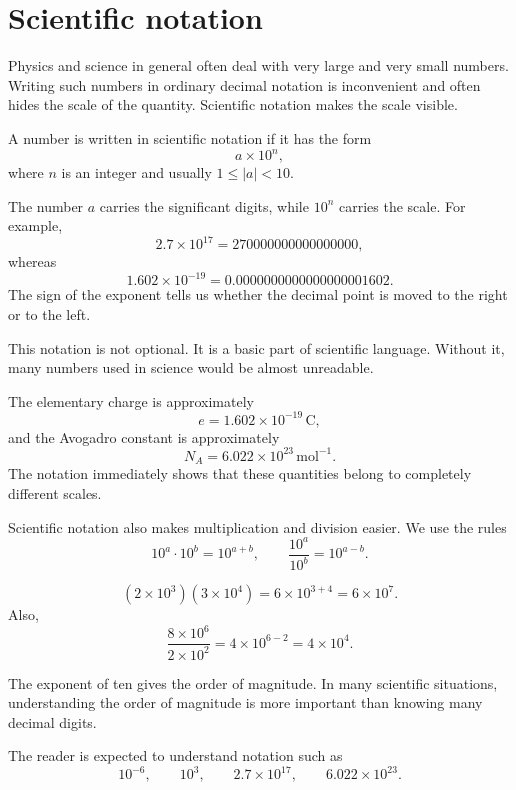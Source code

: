 \section{Scientific notation}

Physics and science in general often deal with very large and very small numbers. Writing such numbers in ordinary decimal notation is inconvenient and often hides the scale of the quantity. Scientific notation makes the scale visible.

\begin{definitionbox}
A number is written in scientific notation if it has the form
\[
a \times 10^n,
\]
where \(n\) is an integer and usually \(1 \leq |a| < 10\).
\end{definitionbox}

The number \(a\) carries the significant digits, while \(10^n\) carries the scale. For example,
\[
2.7\times 10^{17}=270000000000000000,
\]
whereas
\[
1.602\times 10^{-19}=0.0000000000000000001602.
\]
The sign of the exponent tells us whether the decimal point is moved to the right or to the left.

This notation is not optional. It is a basic part of scientific language. Without it, many numbers used in science would be almost unreadable.

The elementary charge is approximately
\[
e = 1.602 \times 10^{-19}\,\mathrm{C},
\]
and the Avogadro constant is approximately
\[
N_A = 6.022 \times 10^{23}\,\mathrm{mol}^{-1}.
\]
The notation immediately shows that these quantities belong to completely different scales.

Scientific notation also makes multiplication and division easier. We use the rules
\[
10^a \cdot 10^b = 10^{a+b},
\qquad
\frac{10^a}{10^b} = 10^{a-b}.
\]

\begin{examplebox}
\[
(2 \times 10^3)(3 \times 10^4)
= 6 \times 10^{3+4}
= 6 \times 10^7.
\]
Also,
\[
\frac{8 \times 10^6}{2 \times 10^2}
= 4 \times 10^{6-2}
= 4 \times 10^4.
\]
\end{examplebox}

\begin{remarkbox}
The exponent of ten gives the order of magnitude. In many scientific situations, understanding the order of magnitude is more important than knowing many decimal digits.
\end{remarkbox}

The reader is expected to understand notation such as
\[
10^{-6}, \qquad 10^3, \qquad 2.7 \times 10^{17}, \qquad 6.022 \times 10^{23}.
\]
